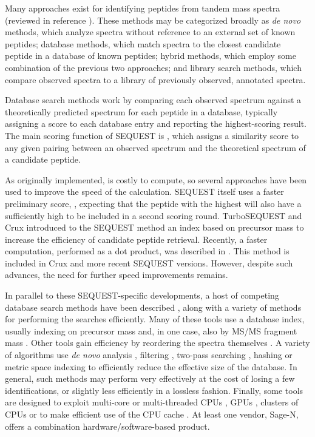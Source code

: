 Many approaches exist for identifying peptides from tandem mass spectra
(reviewed in reference \cite{nesvizhskii:analysis}). These methods may
be categorized broadly
as {\it de novo} methods, which analyze spectra without reference to
an external set of known peptides; database methods, which match
spectra to the closest candidate peptide in a database of known
peptides; hybrid methods, which employ some combination of the
previous two approaches; and library search methods, which compare
observed spectra to a library of previously observed, annotated
spectra.

Database search methods work by comparing each observed spectrum
against a theoretically predicted spectrum for each peptide in a
database, typically assigning a score to each database entry and
reporting the highest-scoring result. The main scoring function of
SEQUEST is \XCorr \cite{eng:approach, eng:fast}, which assigns a
similarity score to any given pairing between an observed spectrum and
the theoretical spectrum of a candidate peptide.

As originally implemented, \XCorr is costly to compute, so several
approaches have been used to improve the speed of the \XCorr
calculation. SEQUEST itself uses a faster preliminary score, \Sp,
expecting that the peptide with the highest \XCorr will also have a
sufficiently high \Sp to be included in a second scoring
round. TurboSEQUEST and Crux \cite{park:rapid} introduced to the
SEQUEST method an index
based on precursor mass to increase the efficiency of candidate
peptide retrieval.  Recently, a faster \XCorr computation,
performed as a dot product, was described in \cite{eng:fast}. This
method is included in Crux and more recent SEQUEST versions. However, despite
such advances, the need for further speed improvements remains.

In parallel to these SEQUEST-specific developments, a host of
competing database search methods have been described
\cite{perkins:probability, clauser:role, bafna:scope, zhang:probid,
  colinge:olav, tabb:myrimatch, geer:open, bern:lookup,
  roos:pepsplice, craig:tandem}, along with a variety of methods for
performing the searches efficiently.  Many of these tools use a
database index, usually indexing on precursor mass and, in one case,
also by MS/MS fragment mass \cite{tang:discovering}.  Other tools gain
efficiency by reordering the spectra themselves \cite{tabb:dbdigger}.
A variety of algorithms use {\em de novo} analysis \cite{bern:lookup},
filtering \cite{tanner:inspect}, two-pass searching
\cite{craig:tandem}, hashing \cite{dutta:speeding} or metric space
indexing \cite{ramakrishnan:fast} to efficiently reduce the effective
size of the database.  In general, such methods may perform very
effectively at the cost of losing a few identifications, or slightly
less efficiently in a lossless fashion.  Finally, some tools are
designed to exploit multi-core or multi-threaded CPUs
\cite{tabb:myrimatch}, GPUs \cite{baumgardner:fast}, clusters of CPUs
\cite{duncan:parallel} or to
make efficient use of the CPU cache \cite{roos:pepsplice, li:speeding}.  At
least one vendor, Sage-N, offers a combination hardware/software-based product.

